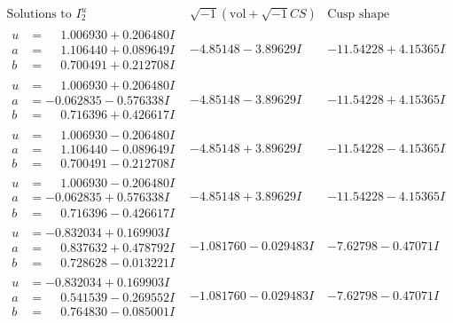\documentclass[1p]{elsarticle_modified}
\theoremstyle{definition}
\newcommand{\I}{\sqrt{-1}}
\begin{document}
$$\begin{array}{c|c|c}  
\text{Solutions to }I^u_{2}& \I (\text{vol} + \sqrt{-1}CS) & \text{Cusp shape}\\
 \hline 
\begin{aligned}
u &= \phantom{-}1.006930 + 0.206480 I \\
a &= \phantom{-}1.106440 + 0.089649 I \\
b &= \phantom{-}0.700491 + 0.212708 I\end{aligned}
 & -4.85148 - 3.89629 I & -11.54228 + 4.15365 I \\ \hline\begin{aligned}
u &= \phantom{-}1.006930 + 0.206480 I \\
a &= -0.062835 - 0.576338 I \\
b &= \phantom{-}0.716396 + 0.426617 I\end{aligned}
 & -4.85148 - 3.89629 I & -11.54228 + 4.15365 I \\ \hline\begin{aligned}
u &= \phantom{-}1.006930 - 0.206480 I \\
a &= \phantom{-}1.106440 - 0.089649 I \\
b &= \phantom{-}0.700491 - 0.212708 I\end{aligned}
 & -4.85148 + 3.89629 I & -11.54228 - 4.15365 I \\ \hline\begin{aligned}
u &= \phantom{-}1.006930 - 0.206480 I \\
a &= -0.062835 + 0.576338 I \\
b &= \phantom{-}0.716396 - 0.426617 I\end{aligned}
 & -4.85148 + 3.89629 I & -11.54228 - 4.15365 I \\ \hline\begin{aligned}
u &= -0.832034 + 0.169903 I \\
a &= \phantom{-}0.837632 + 0.478792 I \\
b &= \phantom{-}0.728628 - 0.013221 I\end{aligned}
 & -1.081760 - 0.029483 I & -7.62798 - 0.47071 I \\ \hline\begin{aligned}
u &= -0.832034 + 0.169903 I \\
a &= \phantom{-}0.541539 - 0.269552 I \\
b &= \phantom{-}0.764830 - 0.085001 I\end{aligned}
 & -1.081760 - 0.029483 I & -7.62798 - 0.47071 I \\ \hline\begin{aligned}

\end{aligned}
\end{array}$$
\end{document}
